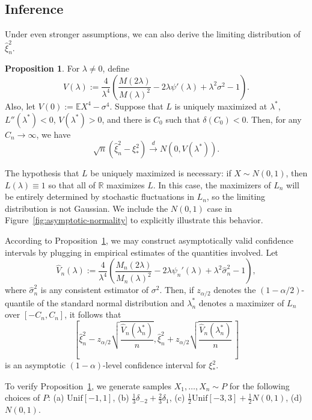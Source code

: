 \documentclass{article}
\theoremstyle{definition}
\newtheorem{proposition}{Proposition}
\newcommand{\R}{\mathbb{R}}
\newcommand{\E}{\mathbb{E}}
\newcommand{\1}{\mathbbm{1}}
\begin{document}
\subsection{Inference}
\label{sec:inference}
Under even stronger assumptions, we can also derive the limiting distribution of $\hat \xi_n^2$. 
\begin{proposition}
\label{prop:ptwise-asymptotic-normality}
For $\lambda \ne 0$, define   
    \[
    V(\lambda) := \frac{4}{\lambda^4}\left(\frac{M(2\lambda)}{M(\lambda)^2} - 2\lambda\psi'(\lambda)+ \lambda^2\sigma^2 - 1\right).
    \]
    Also, let $V(0) := \E X^4 - \sigma^4$. Suppose that $L$ is uniquely maximized at $\lambda^*$, $L''(\lambda^*) < 0$, $V(\lambda^*) > 0$, and there is $C_0$ such that $\delta(C_0) < 0$. 
    Then, for any $C_n \to \infty$, we have 
    \[
    \sqrt n(\hat \xi_n^2 - \xi_*^2) \xrightarrow{d} N(0, V(\lambda^*)).
    \]
\end{proposition}
The hypothesis that $L$ be uniquely maximized is necessary: if $X \sim N(0, 1)$, then $L(\lambda) \equiv 1$ so that all of $\R$ maximizes $L$. In this case, the maximizers of $L_n$ will be entirely determined by stochastic fluctuations in $L_n$, so the limiting distribution is not Gaussian. We include the $N(0, 1)$ case in Figure~\ref{fig:asymptotic-normality} to explicitly illustrate this behavior. 

According to Proposition~\ref{prop:ptwise-asymptotic-normality}, we may construct asymptotically valid confidence intervals by plugging in empirical estimates of the quantities involved. Let 
\[
\hat V_n(\lambda) := \frac{4}{\lambda^4}\left(\frac{M_n(2\lambda)}{M_n(\lambda)^2} - 2\lambda\psi_n'(\lambda) + \lambda^2\hat\sigma^2_n - 1\right),
\]
where $\hat \sigma_n^2$ is any consistent estimator of $\sigma^2$. Then, if $z_{\alpha/2}$ denotes the $(1 - \alpha/2)$-quantile of the standard normal distribution and $\lambda^*_n$ denotes a maximizer of $L_n$ over $[-C_n, C_n]$, it follows that 
\[
\left[\hat \xi_n^2 -  z_{\alpha/2}\sqrt{\frac{\hat V_n(\lambda^*_n)}{n}}, \hat \xi^2_n + z_{\alpha/2}\sqrt{\frac{\hat V_n(\lambda^*_n)}{n}}\, \right]
\]
is an asymptotic $(1 - \alpha)$-level confidence interval for $\xi_*^2$. 

To verify Proposition~\ref{prop:ptwise-asymptotic-normality}, we generate samples $X_1, \dots, X_n \sim P$ for the following choices of $P$: (a) $\mathrm{Unif} [-1, 1]$,
(b) $\frac{1}{3}\delta_{-2} + \frac{2}{3}\delta_1$, 
(c) $\frac12 \mathrm{Unif}[-3, 3] + \frac12N(0, 1)$, 
(d) $N(0, 1)$.
\end{document}
